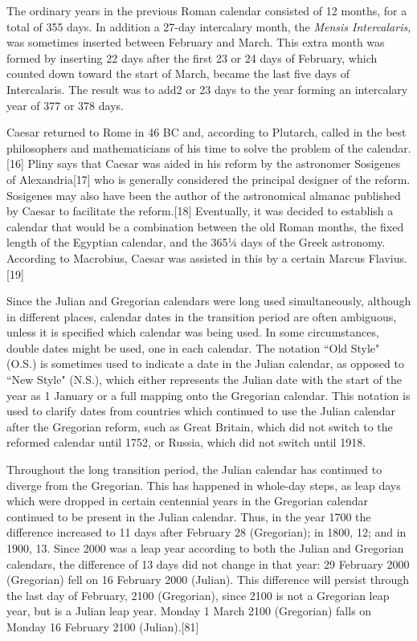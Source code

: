 The ordinary years in the previous Roman calendar consisted of 12 months, for a total of 355 days. In addition a 27-day intercalary month, the \textit{Mensis Intercalaris}, was sometimes inserted between February and March. This extra month was formed by inserting 22 days after the first 23 or 24 days of February, which counted down toward the start of March, 
became the last five days of Intercalaris. The result was to add2 or 23 days to the year forming an intercalary year of 377 or 
378 days.

Caesar returned to Rome in 46 BC and, according to Plutarch, called in the best philosophers and mathematicians of his time to solve the problem of the calendar.[16] Pliny says that Caesar was aided in his reform by the astronomer Sosigenes of Alexandria[17] who is generally considered the principal designer of the reform. Sosigenes may also have been the author of the astronomical almanac published by Caesar to facilitate the reform.[18] Eventually, it was decided to establish a calendar that would be a combination between the old Roman months, the fixed length of the Egyptian calendar, and the 365¼ days of the Greek astronomy. According to Macrobius, Caesar was assisted in this by a certain Marcus Flavius.[19]

Since the Julian and Gregorian calendars were long used simultaneously, although in different places, calendar dates in the transition period are often ambiguous, unless it is specified which calendar was being used. In some circumstances, double dates might be used, one in each calendar. The notation ``Old Style" (O.S.) is sometimes used to indicate a date in the Julian calendar, as opposed to ``New Style" (N.S.), which either represents the Julian date with the start of the year as 1 January or a full mapping onto the Gregorian calendar. This notation is used to clarify dates from countries which continued to use the Julian calendar after the Gregorian reform, such as Great Britain, which did not switch to the reformed calendar until 1752, or Russia, which did not switch until 1918.

Throughout the long transition period, the Julian calendar has continued to diverge from the Gregorian. This has happened in whole-day steps, as leap days which were dropped in certain centennial years in the Gregorian calendar continued to be present in the Julian calendar. Thus, in the year 1700 the difference increased to 11 days after February 28 (Gregorian); in 1800, 12; and in 1900, 13. Since 2000 was a leap year according to both the Julian and Gregorian calendars, the difference of 13 days did not change in that year: 29 February 2000 (Gregorian) fell on 16 February 2000 (Julian). This difference will persist through the last day of February, 2100 (Gregorian), since 2100 is not a Gregorian leap year, but is a Julian leap year. Monday 1 March 2100 (Gregorian) falls on Monday 16 February 2100 (Julian).[81]


